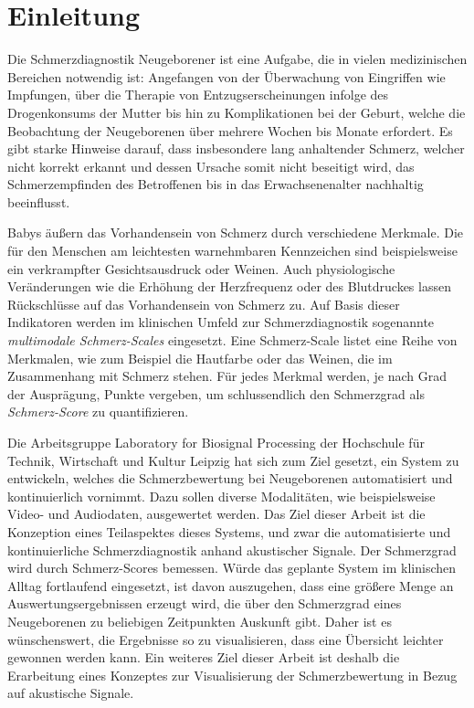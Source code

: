 \chapter{Einleitung}

Die Schmerzdiagnostik Neugeborener ist eine Aufgabe, die in vielen medizinischen Bereichen notwendig ist: Angefangen von der Überwachung von Eingriffen wie Impfungen, über die Therapie von Entzugserscheinungen infolge des Drogenkonsums der Mutter bis hin zu Komplikationen bei der Geburt, welche die Beobachtung der Neugeborenen über mehrere Wochen bis Monate erfordert. Es gibt starke Hinweise darauf, dass insbesondere lang anhaltender Schmerz, welcher nicht korrekt erkannt und dessen Ursache somit nicht beseitigt wird, das Schmerzempfinden des Betroffenen bis in das Erwachsenenalter nachhaltig beeinflusst.\cite[S. 402]{PainAssessment03}

Babys äußern das Vorhandensein von Schmerz durch verschiedene Merkmale. Die für den Menschen am leichtesten warnehmbaren Kennzeichen sind beispielsweise ein verkrampfter Gesichtsausdruck oder Weinen. Auch physiologische Veränderungen wie die Erhöhung der Herzfrequenz oder des Blutdruckes lassen Rückschlüsse auf das Vorhandensein von Schmerz zu.\cite[S. 440]{PainAssessment01} Auf Basis dieser Indikatoren werden im klinischen Umfeld zur Schmerzdiagnostik sogenannte \emph{multimodale Schmerz-Scales} eingesetzt. Eine Schmerz-Scale listet eine Reihe von Merkmalen, wie zum Beispiel die Hautfarbe oder das Weinen, die im Zusammenhang mit Schmerz stehen. Für jedes Merkmal werden, je nach Grad der Ausprägung, Punkte vergeben, um schlussendlich den Schmerzgrad als \emph{Schmerz-Score} zu quantifizieren.\cite[S. 406]{PainAssessment03}

Die Arbeitsgruppe \glqq Laboratory for Biosignal Processing\grqq{} der Hochschule für Technik, Wirtschaft und Kultur Leipzig hat sich zum Ziel gesetzt, ein System zu entwickeln, welches die Schmerzbewertung bei Neugeborenen automatisiert und kontinuierlich vornimmt. Dazu sollen diverse Modalitäten, wie beispielsweise Video- und Audiodaten, ausgewertet werden. Das Ziel dieser Arbeit ist die Konzeption eines Teilaspektes dieses Systems, und zwar die automatisierte und kontinuierliche Schmerzdiagnostik anhand akustischer Signale. Der Schmerzgrad wird durch Schmerz-Scores bemessen. Würde das geplante System im klinischen Alltag fortlaufend eingesetzt, ist davon auszugehen, dass eine größere Menge an Auswertungsergebnissen erzeugt wird, die über den Schmerzgrad eines Neugeborenen zu beliebigen Zeitpunkten Auskunft gibt. Daher ist es wünschenswert, die Ergebnisse so zu visualisieren, dass eine Übersicht leichter gewonnen werden kann. Ein weiteres Ziel dieser Arbeit ist deshalb die Erarbeitung eines Konzeptes zur Visualisierung der Schmerzbewertung in Bezug auf akustische Signale.


